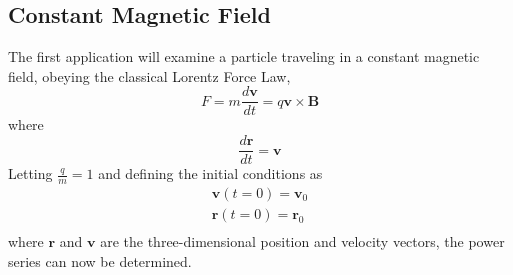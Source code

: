 \documentclass[9pt]{article}
\begin{document}
\begin{multicols}{2}
\section{Constant Magnetic Field}
The first application will examine a particle traveling in a constant magnetic field, obeying the classical Lorentz Force Law,  
    \begin{equation} \label{eq:4} 
        F=m\frac{d\mathbf{v}}{dt}=q\mathbf{v}\times\mathbf{B}
    \end{equation}
where
    \begin{equation}  \label{eq:1}
        \frac{d\mathbf{r}}{dt}=\mathbf{v}
    \end{equation}
Letting $\frac{q}{m}=1$ and defining the initial conditions as 
    \begin{equation}
        \begin{split}
            \mathbf{v}(t=0)=\mathbf{v}_0\\
            \mathbf{r}(t=0)=\mathbf{r}_0\\
        \end{split}
    \end{equation}
where $\mathbf{r}$ and $\mathbf{v}$ are the three-dimensional position and velocity vectors, the power series can now be determined.

\end{multicols}
\end{document}
